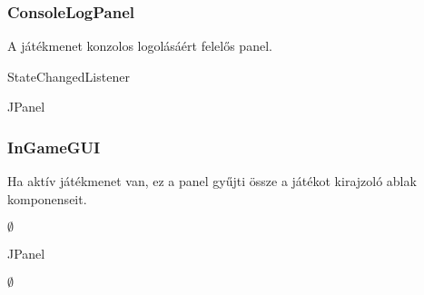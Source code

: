 \documentclass[../../projlab]{subfiles}
\begin{document}
\subsubsection{ConsoleLogPanel}
\begin{class-template-responsibility}
    A játékmenet konzolos logolásáért felelős panel.  
\end{class-template-responsibility}
\begin{class-template-interface}
    StateChangedListener
\end{class-template-interface}
\begin{class-template-baseclass}
    JPanel
\end{class-template-baseclass}
\begin{class-template-attribute}
\end{class-template-attribute}
\begin{class-template-method}
\end{class-template-method}

\subsubsection{InGameGUI}
\begin{class-template-responsibility}
    Ha aktív játékmenet van, ez a panel gyűjti össze a játékot kirajzoló ablak komponenseit.  
\end{class-template-responsibility}
\begin{class-template-interface}
    $\emptyset$
\end{class-template-interface}
\begin{class-template-baseclass}
    JPanel
\end{class-template-baseclass}
\begin{class-template-attribute}
    \item[] $\emptyset$
\end{class-template-attribute} 
\begin{class-template-method}
\end{class-template-method}
\end{document}
